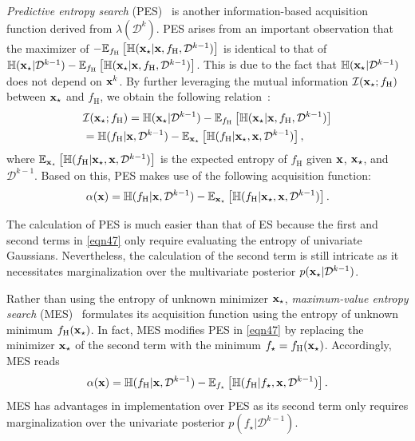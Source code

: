 \documentclass[iicol,sn-basic]{sn-jnl}%
\begin{document}
\textit{Predictive entropy search} (PES)~\citep{HernandezLobato2014} is another information-based acquisition function derived from $\lambda(\mathcal{D}^{k})$.
PES arises from an important observation that the maximizer of $-\mathbb{E}_{f_\text{H}}\left[\mathbb{H}({\bf x}_\star|{\bf x},f_\text{H},\mathcal{D}^{k-1})\right]$ is identical to that of $\mathbb{H}({\bf x}_\star|\mathcal{D}^{k-1})-\mathbb{E}_{f_\text{H}}\left[\mathbb{H}({\bf x}_\star|{\bf x},f_\text{H},\mathcal{D}^{k-1})\right]$.
This is due to the fact that $\mathbb{H}({\bf x}_\star|\mathcal{D}^{k-1})$ does not depend on ${\bf x}^k$.
By further leveraging the mutual information $\mathcal{I}({\bf x}_\star;f_\text{H})$ between ${\bf x}_\star$ and $f_\text{H}$, we obtain the following relation~\citep{Houlsby2012}:
\begin{equation}\label{eqn46}
	\begin{aligned}
		& \mathcal{I}({\bf x}_\star;f_\text{H})
		= \mathbb{H}({\bf x}_\star|\mathcal{D}^{k-1})-\mathbb{E}_{f_\text{H}}\left[\mathbb{H}({\bf x}_\star|{\bf x},f_\text{H},\mathcal{D}^{k-1})\right]\\
		& = \mathbb{H}(f_\text{H}|{\bf x},\mathcal{D}^{k-1})-\mathbb{E}_{{\bf x}_\star}\left[\mathbb{H}(f_\text{H}|{\bf x}_\star,{\bf x},\mathcal{D}^{k-1})\right],
	\end{aligned}
\end{equation}
where $\mathbb{E}_{{\bf x}_\star}\left[\mathbb{H}(f_\text{H}|{\bf x}_\star,{\bf x},\mathcal{D}^{k-1})\right]$ is the expected entropy of $f_\text{H}$ given ${\bf x}$, ${\bf x}_\star$, and $\mathcal{D}^{k-1}$.
Based on this, PES makes use of the following acquisition function:
\begin{equation}\label{eqn47}
		\alpha({\bf x}) 
		= \mathbb{H}(f_\text{H}|{\bf x},\mathcal{D}^{k-1})-\mathbb{E}_{{\bf x}_\star}\left[\mathbb{H}(f_\text{H}|{\bf x}_\star,{\bf x},\mathcal{D}^{k-1})\right].
\end{equation}

The calculation of PES is much easier than that of ES because the first and second terms in \cref{eqn47} only require evaluating the entropy of univariate Gaussians.
Nevertheless, the calculation of the second term is still intricate as it necessitates marginalization over the multivariate posterior $p({\bf x}_\star|\mathcal{D}^{k-1})$.

Rather than using the entropy of unknown minimizer ${\bf x}_\star$, \textit{maximum-value entropy search} (MES)~\citep{WangZ2017} formulates its acquisition function using the entropy of unknown minimum $f_\text{H}({\bf x}_\star)$.
In fact, MES modifies PES in \cref{eqn47} by replacing the minimizer ${\bf x}_\star$ of the second term with the minimum $f_\star = f_\text{H}({\bf x}_\star)$.
Accordingly, MES reads
\begin{equation}\label{eqn48}
	\alpha({\bf x})
	= \mathbb{H}(f_\text{H}|{\bf x},\mathcal{D}^{k-1})-\mathbb{E}_{f_\star }\left[\mathbb{H}(f_\text{H}|f_\star ,{\bf x},\mathcal{D}^{k-1})\right].
\end{equation}
MES has advantages
in implementation over PES as its second term only requires marginalization over the univariate posterior $p(f_\star|\mathcal{D}^{k-1})$.
\end{document}
